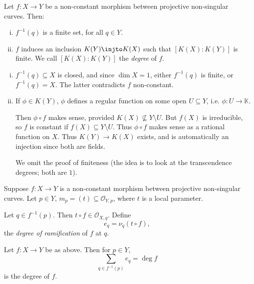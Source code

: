 \documentclass[12pt]{article}
\begin{document}
\begin{proposition}
	Let $f : X \to Y$ be a non-constant morphism between projective non-singular curves. Then:
	\begin{enumerate}[(i)]
		\item $f^{-1}(q)$ is a finite set, for all $q \in Y$.
		\item $f$ induces an inclusion $K(Y) \injto K(X)$ such that $[K(X):K(Y)]$ is finite. We call $[K(X): K(Y)]$ the \emph{degree} of $f$.
	\end{enumerate}
\end{proposition}

\begin{proofbox}
	
	\begin{enumerate}[(i)]
		\item $f^{-1}(q) \subseteq X$ is closed, and since $\dim X = 1$, either $f^{-1}(q)$ is finite, or $f^{-1}(q) = X$. The latter contradicts $f$ non-constant.
		\item If $\phi \in K(Y)$, $\phi$ defines a regular function on some open $U \subseteq Y$, i.e. $\phi : U \to \mathbb{K}$.

			Then $\phi \circ f$ makes sense, provided $K(X) \not \subseteq Y \setminus U$. But $f(X)$ is irreducible, so $f$ is constant if $f(X) \subseteq Y \setminus U$. Thus $\phi \circ f$ makes sense as a rational function on $X$. Thus $K(Y) \to K(X)$ exists, and is automatically an injection since both are fields.

			We omit the proof of finiteness (the idea is to look at the transcendence degrees; both are $1$).
	\end{enumerate}
\end{proofbox}

\begin{definition}
	Suppose $f : X \to Y$ is a non-constant morphism between projective non-singular curves. Let $p \in Y$, $m_p = (t) \subseteq \mathcal{O}_{Y, p}$, where $t$ is a local parameter.

	Let $q \in f^{-1}(p)$. Then $t \circ f \in \mathcal{O}_{X, q}$. Define
	\[
	e_q = \nu_q(t \circ f),
	\]
	the \emph{degree of ramification} of $f$ at $q$.
\end{definition}

\begin{theorem}
	Let $f : X \to Y$ be as above. Then for $p \in Y$,
	\[
	\sum_{q \in f^{-1}(p)} e_q = \deg f
	\]
	is the degree of $f$.
\end{theorem}
\end{document}
